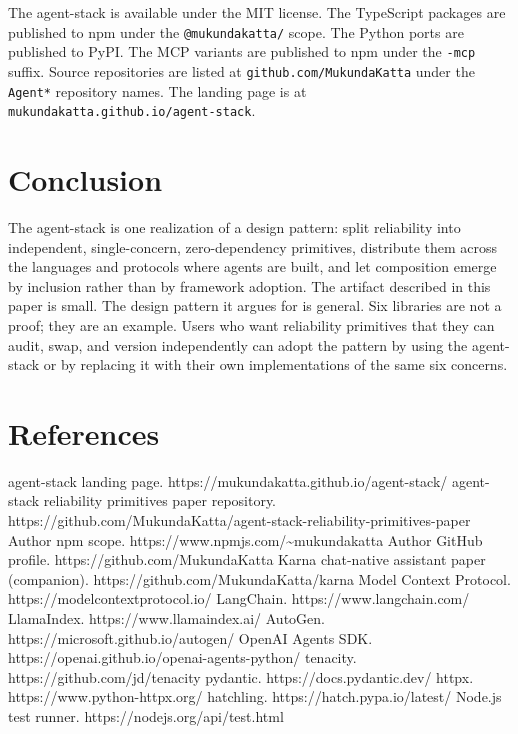 \documentclass[11pt]{article}
\begin{document}
The agent-stack is available under the MIT license. The TypeScript packages are published to npm under the \texttt{@mukundakatta/} scope. The Python ports are published to PyPI. The MCP variants are published to npm under the \texttt{-mcp} suffix. Source repositories are listed at \texttt{github.com/MukundaKatta} under the \texttt{Agent*} repository names. The landing page is at \texttt{mukundakatta.github.io/agent-stack}.

\section{Conclusion}


The agent-stack is one realization of a design pattern: split reliability into independent, single-concern, zero-dependency primitives, distribute them across the languages and protocols where agents are built, and let composition emerge by inclusion rather than by framework adoption. The artifact described in this paper is small. The design pattern it argues for is general. Six libraries are not a proof; they are an example. Users who want reliability primitives that they can audit, swap, and version independently can adopt the pattern by using the agent-stack or by replacing it with their own implementations of the same six concerns.

\section{References}


agent-stack landing page. https://mukundakatta.github.io/agent-stack/
agent-stack reliability primitives paper repository. https://github.com/MukundaKatta/agent-stack-reliability-primitives-paper
Author npm scope. https://www.npmjs.com/\textasciitilde{}mukundakatta
Author GitHub profile. https://github.com/MukundaKatta
Karna chat-native assistant paper (companion). https://github.com/MukundaKatta/karna
Model Context Protocol. https://modelcontextprotocol.io/
LangChain. https://www.langchain.com/
LlamaIndex. https://www.llamaindex.ai/
AutoGen. https://microsoft.github.io/autogen/
OpenAI Agents SDK. https://openai.github.io/openai-agents-python/
tenacity. https://github.com/jd/tenacity
pydantic. https://docs.pydantic.dev/
httpx. https://www.python-httpx.org/
hatchling. https://hatch.pypa.io/latest/
Node.js test runner. https://nodejs.org/api/test.html
\end{document}
